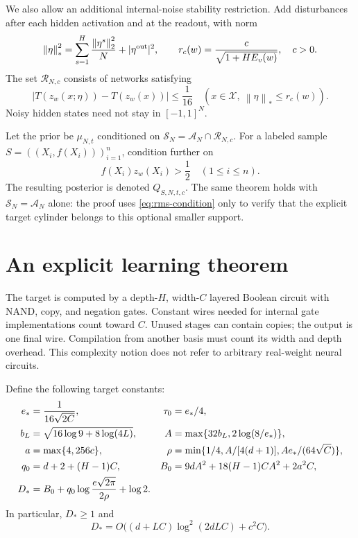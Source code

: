 \documentclass[11pt]{article}
\newcommand{\norm}[1]{\left\|#1\right\|}
\begin{document}
We also allow an additional internal-noise stability restriction. Add
disturbances after each hidden activation and at the readout, with norm
\[
 \norm\eta_*^2=\sum_{s=1}^H\frac{\norm{\eta^s}_2^2}{N}
                       +|\eta^{\rm out}|^2,
 \qquad r_c(w)=\frac{c}{\sqrt{1+HE_v(w)}},\quad c>0.
\]
The set $\mathcal R_{N,c}$ consists of networks satisfying
\begin{equation}\label{eq:rms-condition}
 |T(z_w(x;\eta))-T(z_w(x))|\le\frac1{16}
 \quad (x\in\mathcal X,\ \norm\eta_*\le r_c(w)).
\end{equation}
Noisy hidden states need not stay in $[-1,1]^N$.

Let the prior be $\mu_{N,t}$ conditioned on
$\mathcal S_N=\mathcal A_N\cap\mathcal R_{N,c}$.
For a labeled sample $S=((X_i,f(X_i)))_{i=1}^n$, condition further on
\begin{equation}\label{eq:likelihood}
 f(X_i)z_w(X_i)>\frac12\quad(1\le i\le n).
\end{equation}
The resulting posterior is denoted $Q_{S,N,t,c}$.
The same theorem holds with $\mathcal S_N=\mathcal A_N$ alone: the proof
uses \eqref{eq:rms-condition} only to verify that the explicit target
cylinder belongs to this optional smaller support.

\section{An explicit learning theorem}

The target is computed by a depth-$H$, width-$C$ layered Boolean circuit
with NAND, copy, and negation gates. Constant wires needed for internal
gate implementations count toward $C$. Unused stages can contain copies;
the output is one final wire. Compilation from another basis must count
its width and depth overhead. This complexity notion does not refer to
arbitrary real-weight neural circuits.

Define the following target constants:
\begin{align}
 e_*&=\frac1{16\sqrt{2C}}, &\tau_0&=e_*/4,\notag\\
 b_L&=\sqrt{16\log9+8\log(4L)}, &
 A&=\max\{32b_L,2\log(8/e_*)\},\notag\\
 a&=\max\{4,256c\}, &
 \rho&=\min\{1/4,A/[4(d+1)],Ae_*/(64\sqrt C)\},\notag\\
 q_0&=d+2+(H-1)C, &
 B_0&=9dA^2+18(H-1)CA^2+2a^2C,\notag\\
 D_*&=B_0+q_0\log\frac{e\sqrt{2\pi}}{2\rho}+\log2.
 \label{eq:target-constants}
\end{align}
In particular, $D_*\ge1$ and
\begin{equation}\label{eq:target-asymptotic}
 D_*=O\bigl((d+LC)\log^2(2dLC)+c^2C\bigr).
\end{equation}
\end{document}

